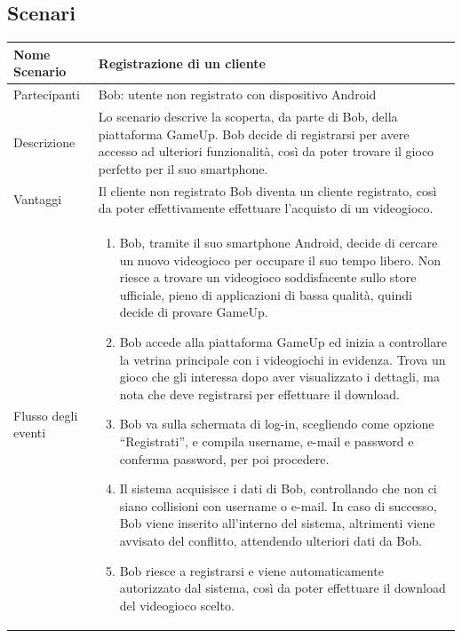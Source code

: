 \subsection{Scenari}
	\small\begin{tabular}{|| l | p{30em} ||} 
	\hline
	Nome Scenario & Registrazione di un cliente\\
	\hline
	Partecipanti & Bob: utente non registrato con dispositivo Android\\
	\hline
	Descrizione & Lo scenario descrive la scoperta, da parte di Bob, della piattaforma GameUp. Bob decide di registrarsi per avere accesso ad ulteriori funzionalità, così da poter trovare il gioco perfetto per il suo smartphone.\\
	\hline
	Vantaggi & Il cliente non registrato Bob diventa un cliente registrato, così da poter effettivamente effettuare l’acquisto di un videogioco.\\
	\hline
	Flusso degli eventi &
	\begin{enumerate}
		\item Bob, tramite il suo smartphone Android, decide di cercare un nuovo videogioco per occupare il suo tempo libero. Non riesce a trovare un videogioco soddisfacente sullo store ufficiale, pieno di applicazioni di bassa qualità, quindi decide di provare GameUp.
		\item Bob accede alla piattaforma GameUp ed inizia a controllare la vetrina principale con i videogiochi in evidenza. Trova un gioco che gli interessa dopo aver visualizzato i dettagli, ma nota che deve registrarsi per effettuare il download.
		\item Bob va sulla schermata di log-in, scegliendo come opzione “Registrati”, e compila username, e-mail e password e conferma password, per poi procedere.
		\item Il sistema acquisisce i dati di Bob, controllando che non ci siano collisioni con username o e-mail. In caso di successo, Bob viene inserito all’interno del sistema, altrimenti viene avvisato del conflitto, attendendo ulteriori dati da Bob.
		\item Bob riesce a registrarsi e viene automaticamente autorizzato dal sistema, così da poter effettuare il download del videogioco scelto.
	\end{enumerate} \\
	\hline
	\end{tabular}

